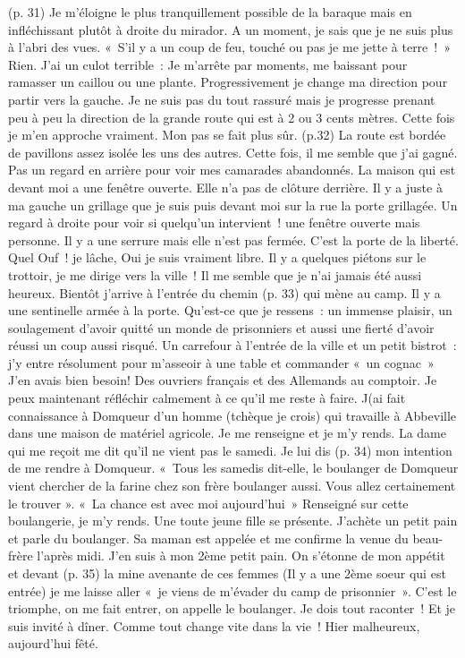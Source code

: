 \documentclass[a5paper,pagesize,10pt,bibtotoc,pointlessnumbers,
normalheadings,DIV=9,twoside=false]{scrbook}
\begin{document}
	(p. 31) Je m’éloigne le plus tranquillement possible de la baraque mais en infléchissant plutôt à droite du mirador. A un moment, je sais que je ne suis plus à l’abri des vues. « S’il y a un coup de feu, touché ou pas je me jette à terre ! » Rien. J’ai un culot terrible : Je m’arrête par moments, me baissant pour ramasser un caillou ou une plante. Progressivement je change ma direction pour partir vers la gauche. Je ne suis pas du tout rassuré mais je progresse prenant peu à peu la direction de la grande route qui est à 2 ou 3 cents mètres. Cette fois je m’en approche vraiment. Mon pas se fait plus sûr. (p.32) La route est bordée de pavillons assez isolée les uns des autres. Cette fois, il me semble que j’ai gagné. Pas un regard en arrière pour voir mes camarades abandonnés. La maison qui est devant moi a une fenêtre ouverte. Elle n’a pas de clôture derrière. Il y a juste à ma gauche un grillage que je suis puis devant moi sur la rue la porte grillagée. Un regard à droite pour voir si quelqu’un intervient ! une fenêtre ouverte mais personne. Il y a une serrure mais elle n’est pas fermée. C’est la porte de la liberté. Quel Ouf ! je lâche, Oui je suis vraiment libre. Il y a quelques piétons sur le trottoir, je me dirige vers la ville ! Il me semble que je n’ai jamais été aussi heureux. Bientôt j’arrive à l’entrée du chemin (p. 33) qui mène au camp. Il y a une sentinelle armée à la porte. Qu’est-ce que je ressens : un immense plaisir, un soulagement d’avoir quitté un monde de prisonniers et aussi une fierté d’avoir réussi un coup aussi risqué. 
	Un carrefour à l’entrée de la ville et un petit bistrot : j’y entre résolument pour m’asseoir à une table et commander « un cognac » J’en avais bien besoin! Des ouvriers français et des Allemands au comptoir. Je peux maintenant réfléchir calmement à ce qu’il me reste à faire. J(ai fait connaissance à Domqueur d’un homme (tchèque je crois) qui travaille  à Abbeville dans une maison de matériel agricole. Je me renseigne et je m’y rends. La dame qui me reçoit me dit qu’il ne vient pas le samedi. Je lui dis (p. 34) mon intention de me rendre à Domqueur. « Tous les samedis dit-elle, le boulanger de Domqueur vient chercher de la farine chez son frère boulanger aussi. Vous allez certainement le trouver ». « La chance est avec moi aujourd’hui » Renseigné sur cette boulangerie, je m’y rends. Une toute jeune fille se présente. J’achète un petit pain et parle du boulanger. Sa maman est appelée et me confirme la venue du beau-frère l’après midi. J’en suis à mon 2ème petit pain. On s’étonne de mon appétit et devant (p. 35) la mine avenante de ces femmes (Il y a une 2ème soeur qui est entrée) je me laisse aller « je viens de m’évader du camp de prisonnier ». C’est le triomphe, on me fait entrer, on appelle le boulanger. Je dois tout raconter ! Et je suis invité à dîner. Comme tout change vite dans la vie ! Hier malheureux, aujourd’hui fêté.
\end{document}

